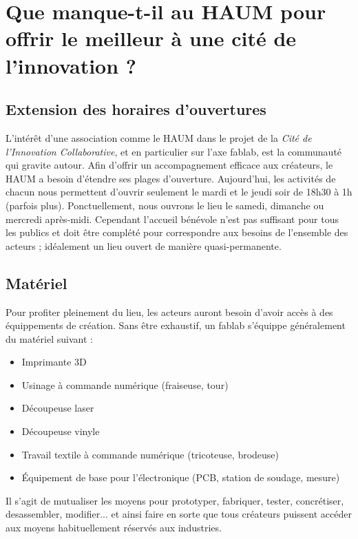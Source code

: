 \documentclass[a4paper,10pt]{scrartcl}
\begin{document}
\section{Que manque-t-il au HAUM pour offrir le meilleur à une cité de l'innovation ?}

\subsection*{Extension des horaires d'ouvertures}

L'intérêt d'une association comme le HAUM dans le projet de la \emph{Cité de l'Innovation Collaborative}, et en particulier sur l'axe fablab, est la communauté qui gravite autour.
Afin d'offrir un accompagnement efficace aux créateurs, le HAUM a besoin d'étendre ses plages d'ouverture. Aujourd'hui, les activités de chacun nous permettent d'ouvrir seulement le mardi et le jeudi soir de 18h30 à 1h (parfois plus). Ponctuellement, nous ouvrons le lieu le samedi, dimanche ou mercredi après-midi.
Cependant l'accueil bénévole n'est pas suffisant pour tous les publics et doit être complété pour correspondre aux besoins de l'ensemble des acteurs ; idéalement un lieu ouvert de manière quasi-permanente.

\subsection*{Matériel}

Pour profiter pleinement du lieu, les acteurs auront besoin d'avoir accès à des équippements de création.
Sans être exhaustif, un fablab s'équippe généralement du matériel suivant :

\begin{itemize}
 \item Imprimante 3D
 \item Usinage à commande numérique (fraiseuse, tour)
 \item Découpeuse laser
 \item Découpeuse vinyle
 \item Travail textile à commande numérique (tricoteuse, brodeuse)
 \item Équipement de base pour l'électronique (PCB, station de soudage, mesure)
\end{itemize}

Il s'agit de mutualiser les moyens pour prototyper, fabriquer, tester, concrétiser, desassembler, modifier... et ainsi faire en sorte que tous créateurs puissent accéder aux moyens habituellement réservés aux industries.
\end{document}
